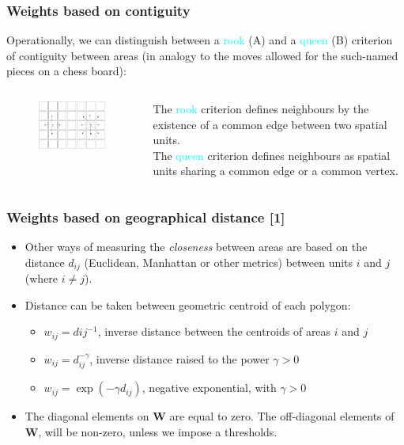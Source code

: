 \documentclass[12pt]{beamer}
\begin{document}
\begin{frame}
\frametitle{Weights based on contiguity}
Operationally, we can distinguish between a \textcolor{cyan}{rook} (A) and a \textcolor{cyan}{queen} (B) criterion of contiguity between areas (in analogy to the moves allowed for the such-named pieces on a chess board):
\begin{columns}
\begin{figure}
  \includegraphics[width=1.7in]{Weights.jpg}
\end{figure}
\small{The \textcolor{cyan}{rook} criterion defines neighbours by the existence of a common edge between two spatial units.\\ The \textcolor{cyan}{queen} criterion defines neighbours as spatial units sharing a common edge or a common vertex}.
\end{columns}
\end{frame}

\begin{frame}
\frametitle{Weights based on geographical distance [1]}
\begin{itemize} \setlength\itemsep{\fill}
\item Other ways of measuring the \emph{closeness} between areas are based on the distance $d_{ij}$ (Euclidean, Manhattan or other metrics) between units $i$ and $j$ (where $i\neq j$).
\item Distance can be taken between geometric centroid of each polygon:
\begin{itemize} \setlength\itemsep{\fill}
\item $w_{ij}=d{ij}^{-1} $, inverse distance between the centroids of areas $i$ and $j$
\item $w_{ij}=d^{-\gamma}_{ij}$, inverse distance raised to the power $\gamma >0$
\item $w_{ij}=\exp(-\gamma d_{ij})$, negative exponential, with $\gamma >0$
\end{itemize}
\item The diagonal elements on $\mathbf{W}$ are equal to zero. The off-diagonal elements of $\mathbf{W}$, will be non-zero, unless we impose a thresholds.
\end{itemize}
\end{frame}
\end{document}
